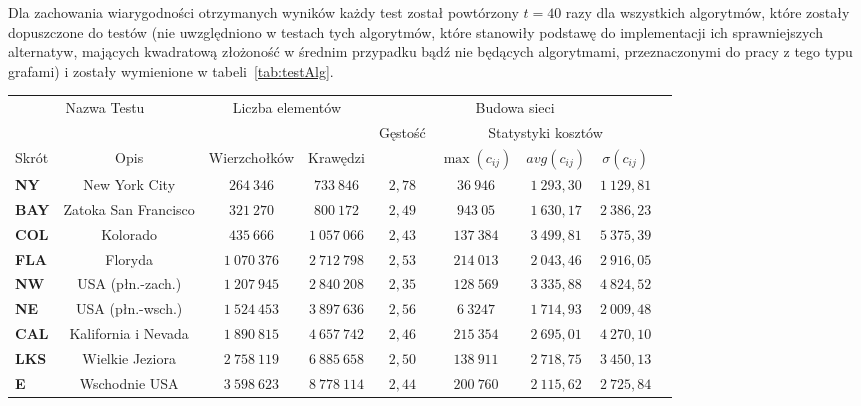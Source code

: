 Dla zachowania wiarygodności otrzymanych wyników każdy test został powtórzony $t = 40$ razy dla wszystkich algorytmów, które zostały dopuszczone do testów (nie uwzględniono w testach tych algorytmów, które stanowiły podstawę do implementacji ich sprawniejszych alternatyw, mających kwadratową złożoność w średnim przypadku bądź nie będących algorytmami, przeznaczonymi do pracy z tego typu grafami) i zostały wymienione w tabeli~\ref{tab:testAlg}.

\begin{table}[h]
	\centering
	\begin{tabular}{lcccccccc}
		\hline
		\multicolumn{2}{c|}{\multirow{2}{*}{Nazwa Testu}} & \multicolumn{2}{c|}{\multirow{2}{*}{Liczba elementów}} & \multicolumn{4}{c}{Budowa sieci} &  \\ \cline{5-9}
		\multicolumn{2}{l|}{} & \multicolumn{2}{c|}{} & \multirow{2}{*}{Gęstość} & \multicolumn{3}{|c}{Statystyki kosztów} &  \\ \cline{1-4} \cline{6-9}
		\multicolumn{1}{l|}{Skrót} & \multicolumn{1}{c|}{Opis} & \multicolumn{1}{c|}{Wierzchołków} & \multicolumn{1}{c|}{Krawędzi} & & \multicolumn{1}{|c}{$\max \left( c_{ij} \right) $} & \multicolumn{1}{|c}{$ avg \left( c_{ij} \right) $} & \multicolumn{1}{|c}{$\sigma \left( c_{ij} \right) $} &  \\
		\hline
		\textbf{NY} & New York City &  $264~346$ &  $733~846$ & $2,78$ & $36~946$ & $1~293,30$ & $1~129,81$ &  \\
		\textbf{BAY} & Zatoka San Francisco &  $321~270$ &  $800~172$ & $2,49$ & $943~05$ & $1~630,17$ & $2~386,23$ &  \\
		\textbf{COL} & Kolorado &  $435~666$ &  $1~057~066$ & $2,43$ & $137~384$ & $3~499,81$ & $5~375,39$ &  \\
		\textbf{FLA} & Floryda &  $1~070~376$ & $2~712~798$ & $2,53$ & $214~013$ & $2~043,46$ & $2~916,05$ &  \\
		\textbf{NW} & USA (płn.-zach.) & $1~207~945$ & $2~840~208$ & $2,35$ & $128~569$ & $3~335,88$ & $4~824,52$ &  \\
		\textbf{NE} & USA (płn.-wsch.) & $1~524~453$ & $3~897~636$ & $2,56$ & $6~3247$ & $1~714,93$ & $2~009,48$ &  \\
		\textbf{CAL} & Kalifornia i Nevada & $1~890~815$ & $4~657~742$ & $2,46$ & $215~354$ & $2~695,01$ & $4~270,10$ &  \\
		\textbf{LKS} & Wielkie Jeziora & $2~758~119$ & $6~885~658$ & $2,50$ & $138~911$ & $2~718,75$ & $3~450,13$ &  \\
		\textbf{E} & Wschodnie USA & $3~598~623$ & $8~778~114$ & $2,44$ & $200~760$ & $2~115,62$ & $2~725,84$ &  \\

\end{tabular}
\end{table}
